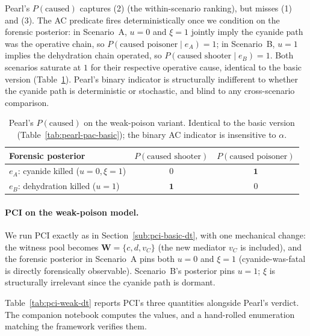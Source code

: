 Pearl's $P(\text{caused})$ captures (2) (the within-scenario ranking),
but misses (1) and (3). The AC predicate
fires deterministically once we condition on the forensic posterior: in
Scenario~A, $u=0$ and $\xi=1$ jointly imply the cyanide path was the operative
chain, so $P(\text{caused poisoner}\mid e_A) = 1$; in Scenario~B, $u=1$
implies the dehydration chain operated, so $P(\text{caused shooter}\mid e_B)
= 1$. Both scenarios saturate at $1$ for their respective operative cause,
identical to the basic version (Table~\ref{tab:pearl-pac-weak}). Pearl's
binary indicator is structurally indifferent to whether the cyanide path is
deterministic or stochastic, and blind to any cross-scenario comparison.

\begin{table}[ht]
\centering
\begin{tabular}{lcc}
\toprule
Forensic posterior & $P(\text{caused shooter})$ & $P(\text{caused poisoner})$ \\
\midrule
$e_A$: cyanide killed ($u=0, \xi=1$) & $0$ & $\mathbf{1}$ \\
$e_B$: dehydration killed ($u=1$)     & $\mathbf{1}$ & $0$ \\
\bottomrule
\end{tabular}
\caption{Pearl's $P(\text{caused})$ on the weak-poison variant. Identical to
the basic version (Table~\ref{tab:pearl-pac-basic}); the binary AC indicator
is insensitive to $\alpha$.}
\label{tab:pearl-pac-weak}
\end{table}

\paragraph{PCI on the weak-poison model.}

We run PCI exactly as in Section~\ref{sub:pci-basic-dt}, with one mechanical
change: the witness pool becomes $\mathbf{W} = \{c, d, v_C\}$ (the new mediator
$v_C$ is included), and the forensic posterior in Scenario~A pins both
$u = 0$ and $\xi = 1$ (cyanide-was-fatal is directly forensically
observable). Scenario~B's posterior pins $u = 1$; $\xi$ is structurally
irrelevant since the cyanide path is dormant.

Table~\ref{tab:pci-weak-dt} reports PCI's three quantities alongside Pearl's
verdict. The companion notebook computes the values, and a hand-rolled
enumeration matching the framework verifies them.

